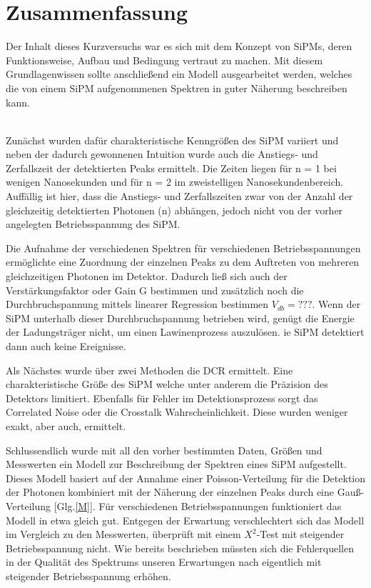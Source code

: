 \documentclass[12pt]{article}
\begin{document}
\section{Zusammenfassung}
Der Inhalt dieses Kurzversuchs war es sich mit dem Konzept von SiPMs, deren Funktionsweise, Aufbau und Bedingung vertraut zu machen.
Mit diesem Grundlagenwissen sollte anschließend ein Modell ausgearbeitet werden, welches die von einem SiPM aufgenommenen Spektren in guter Näherung beschreiben kann.

\\Zunächst wurden dafür charakteristische Kenngrößen des SiPM variiert und neben der dadurch gewonnenen Intuition wurde auch die Anstiegs- und Zerfallszeit der detektierten Peaks ermittelt.
Die Zeiten liegen für n = 1 bei wenigen Nanosekunden und für n = 2 im zweistelligen Nanosekundenbereich.
Auffällig ist hier, dass die Anstiegs- und Zerfallszeiten zwar von der Anzahl der gleichzeitig detektierten Photonen (n) abhängen, jedoch nicht von der vorher angelegten Betriebsspannung des SiPM.

Die Aufnahme der verschiedenen Spektren für verschiedenen Betriebsspannungen ermöglichte eine Zuordnung der einzelnen Peaks zu dem Auftreten von mehreren gleichzeitigen Photonen im Detektor.
Dadurch ließ sich auch der Verstärkungsfaktor oder Gain G bestimmen und zusätzlich noch die Durchbruchspannung mittels linearer Regression bestimmen $V_{db} = ??? $.
Wenn der SiPM unterhalb dieser Durchbruchspannung betrieben wird, genügt die Energie der Ladungsträger nicht, um einen Lawinenprozess auszulösen.
ie SiPM detektiert dann auch keine Ereignisse.

Als Nächstes wurde über zwei Methoden die DCR ermittelt.
Eine charakteristische Größe des SiPM welche unter anderem die Präzision des Detektors limitiert.
Ebenfalls für Fehler im Detektionsprozess sorgt das Correlated Noise oder die Crosstalk Wahrscheinlichkeit.
Diese wurden weniger exakt, aber auch, ermittelt.

Schlussendlich wurde mit all den vorher bestimmten Daten, Größen und Messwerten ein Modell zur Beschreibung der Spektren eines SiPM aufgestellt.
Dieses Modell basiert auf der Annahme einer Poisson-Verteilung für die Detektion der Photonen kombiniert mit der Näherung der einzelnen Peaks durch eine Gauß-Verteilung [Glg.\ref{M}].
Für verschiedenen Betriebsspannungen funktioniert das Modell in etwa gleich gut.
Entgegen der Erwartung verschlechtert sich das Modell im Vergleich zu den Messwerten, überprüft mit einem $X^{2}$-Test mit steigender Betriebsspannung nicht.
Wie bereits beschrieben müssten sich die Fehlerquellen in der Qualität des Spektrums unseren Erwartungen nach eigentlich mit steigender Betriebsspannung erhöhen.
\end{document}
